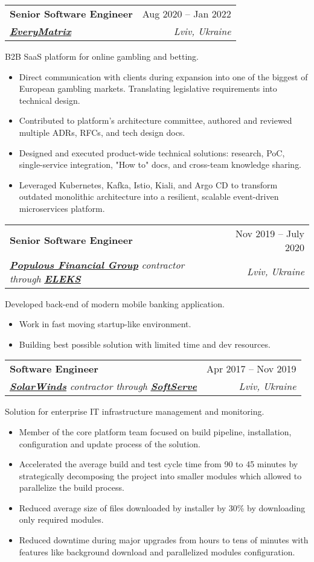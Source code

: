 \documentclass[letterpaper,11pt]{article}
\makeatletter
\newcommand{\resumeItem}[1]{
  \item\small{
    {#1 \vspace{-2pt}}
  }
}
\newcommand{\resumePositionSummary}[1]{
  \item\small{
    {#1 \vspace{-8pt}}
  }
}
\newcommand{\resumeSubheading}[4]{
  \vspace{-2pt}\item
    \begin{tabular*}{0.97\textwidth}[t]{l@{\extracolsep{\fill}}r}
      \textbf{#1} & #2 \\
      \textit{\small#3} & \textit{\small #4} \\
    \end{tabular*}\vspace{-7pt}
}
\newcommand{\resumeSubSubheading}[2]{
    \item
    \begin{tabular*}{0.97\textwidth}{l@{\extracolsep{\fill}}r}
      \textit{\small#1} & \textit{\small #2} \\
    \end{tabular*}\vspace{-7pt}
}
\newcommand{\resumeSubHeadingListEnd}{\end{itemize}}
\newcommand{\resumeItemListStart}{\begin{itemize}}
\newcommand{\resumeItemListEnd}{\end{itemize}\vspace{-5pt}}
\makeatother
\begin{document}

    \resumeSubheading
      {Senior Software Engineer}{Aug 2020 --  Jan 2022}
      {\href{https://everymatrix.com/}{\underline{\textbf{EveryMatrix}}}}{Lviv, Ukraine}

      \resumePositionSummary{B2B SaaS platform for online gambling and betting.}

      \resumeItemListStart
        \resumeItem{Direct communication with clients during expansion into one of the biggest of European gambling markets. Translating legislative requirements into technical design.}
        \resumeItem{Contributed to platform's architecture committee, authored and reviewed multiple ADRs, RFCs, and tech design docs.}
        \resumeItem{Designed and executed product-wide technical solutions: research, PoC, single-service integration, "How to" docs, and cross-team knowledge sharing.}
        \resumeItem{Leveraged Kubernetes, Kafka, Istio, Kiali, and Argo CD to transform outdated monolithic architecture into a resilient, scalable event-driven microservices platform.}
      \resumeItemListEnd

    \resumeSubheading
      {Senior Software Engineer}{Nov 2019 -- July 2020}
      {\href{https://www.populusfinancial.com/}{\underline{\textbf{Populous Financial Group}}} contractor through \href{https://eleks.com/}{\underline{\textbf{ELEKS}}}}{Lviv, Ukraine}
      \resumePositionSummary{Developed back-end of modern mobile banking application.}
      \resumeItemListStart
        \resumeItem{Work in fast moving startup-like environment.}
        \resumeItem{Building best possible solution with limited time and dev resources.}
      \resumeItemListEnd

      \resumeSubheading
      {Software Engineer}{Apr 2017 -- Nov 2019}
      {\href{https://www.solarwinds.com/}{\underline{\textbf{SolarWinds}}} contractor through \href{https://www.softserveinc.com/en-us}{\underline{\textbf{SoftServe}}}}{Lviv, Ukraine}
      \resumePositionSummary{Solution for enterprise IT infrastructure management and monitoring.}
      
      \resumeItemListStart
        \resumeItem{Member of the core platform team focused on build pipeline, installation, configuration and update process of the solution.}
        \resumeItem{Accelerated the average build and test cycle time from 90 to 45 minutes by strategically decomposing the project into smaller modules which allowed to parallelize the build process.}
        \resumeItem{Reduced average size of files downloaded by installer by 30\% by downloading only required modules.}
        \resumeItem{Reduced downtime during major upgrades from hours to tens of minutes with features like background download and parallelized modules configuration.}
      \resumeItemListEnd
\end{document}
